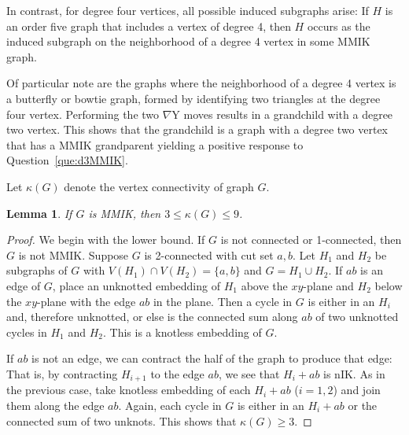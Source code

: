 \documentclass{amsart}
\newtheorem{lemma}[theorem]{Lemma}
\theoremstyle{remark}
\newtheorem{remark}[theorem]{Remark}
\newcommand{\ty}{\nabla\mathrm{Y}}
\begin{document}
{In contrast,  for degree four vertices,
all possible induced subgraphs arise:
If $H$ is an order five graph that includes a vertex of degree
4, then $H$ occurs as the induced subgraph on the neighborhood
of a degree 4 vertex in some MMIK graph.

Of particular note are the graphs where the neighborhood of a degree 4 vertex is a butterfly or bowtie graph, 
formed by identifying two triangles at the degree four vertex. Performing the two $\ty$ moves
results in a grandchild with a degree two vertex. This shows that the grandchild is a graph with a degree two vertex that
has a MMIK grandparent yielding a positive response to Question~\ref{que:d3MMIK}.


Let $\kappa(G)$ denote the vertex connectivity of graph $G$.
\begin{lemma} If $G$ is MMIK, then $3 \leq \kappa(G) \leq 9$.
\end{lemma}

\begin{proof} 
We begin with the lower bound.
If $G$ is not connected or 1-connected, then $G$ is not MMIK. Suppose $G$ is 2-connected with cut set ${a,b}$. Let $H_1$ and
$H_2$ be subgraphs of $G$ with $V(H_1) \cap V(H_2) = \{a,b\}$ and $G = H_1 \cup H_2$.
If $ab$ is an edge of $G$,
place an unknotted embedding of $H_1$ above the $xy$-plane and $H_2$ below the $xy$-plane with
the edge $ab$ in the plane. Then a cycle in $G$ is either in an $H_i$ and, therefore unknotted, or else
is the connected sum along $ab$ of two unknotted cycles in $H_1$ and $H_2$. This is a knotless embedding
of $G$.

If $ab$ is not an edge, we can contract the half of the graph to produce that edge:
That is, by contracting $H_{i+1}$ to the edge $ab$, we see that $H_i + ab$ is nIK.
As in the previous case, take knotless embedding of each $H_i + ab$ ($i = 1,2$) and join them along the edge $ab$.
Again, each cycle in $G$ is either in an $H_i+ab$ or the connected sum of two unknots.
This shows that $\kappa(G) \geq 3$.


\end{proof}}
\end{document}
